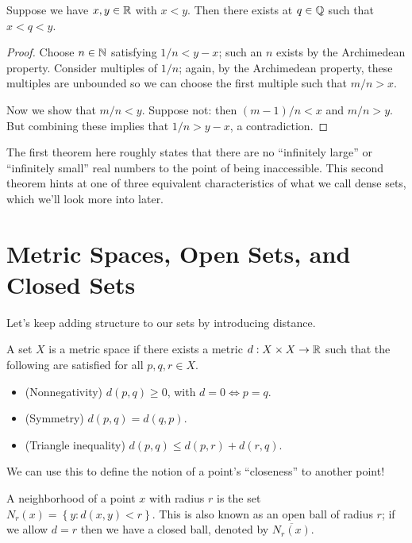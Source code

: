 \documentclass[../m131main.tex]{subfiles}
\begin{document}
\begin{theorem}[$\Q$ is dense in $\R$]
    Suppose we have $x,y \in \mathbb{R}$ with $x < y$. Then there exists at $q \in \mathbb{Q}$ such that $x < q < y$.
\end{theorem}

\begin{proof}
    Choose $n \in \mathbb{N}$ satisfying $1 / n < y - x$; such an $n$ exists by the Archimedean property.
    Consider multiples of $1 / n$; again, by the Archimedean property, these multiples are unbounded so we can choose the first multiple such that $m / n > x$.

    Now we show that $m / n < y$.
    Suppose not: then $(m-1) / n < x$ and $m / n > y$.
    But combining these implies that $1 / n > y - x$, a contradiction.
\end{proof}

The first theorem here roughly states that there are no ``infinitely large'' or ``infinitely small'' real numbers to the point of being inaccessible.
This second theorem hints at one of three equivalent characteristics of what we call dense sets, which we'll look more into later.

\section{Metric Spaces, Open Sets, and Closed Sets}
Let's keep adding structure to our sets by introducing distance.

\begin{definition}
    A set $X$ is a metric space if there exists a metric $d : X \times X \to \mathbb{R}$ such that the following are satisfied for all $p,q,r \in X$.
    \begin{itemize}
        \item (Nonnegativity) $d(p,q) \geq 0$, with $d = 0 \iff p = q$.
        \item (Symmetry) $d(p,q) = d(q,p)$.
        \item (Triangle inequality) $d(p,q) \leq d(p,r) + d(r,q)$.
    \end{itemize}
\end{definition}

We can use this to define the notion of a point's ``closeness'' to another point!

\begin{definition}[Neighborhood]
    A neighborhood of a point $x$ with radius $r$ is the set $N_r(x) = \left\{ y : d(x,y) < r \right\}$.
    This is also known as an open ball of radius $r$; if we allow $d = r$ then we have a closed ball, denoted by $\overline{N_r(x)}$.
\end{definition}
\end{document}
